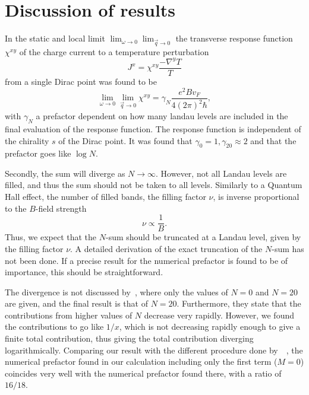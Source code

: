 \documentclass[
paper=B5,
]{scrbook}
\begin{document}
\section{Discussion of results}
In the static and local limit $\lim_{\omega \to 0} \lim_{\vec{q}\to 0}$ the  transverse response function $\chi^{xy}$ of the charge current to a temperature perturbation
\begin{equation}
  J^x = \chi ^{xy} \frac{- \nabla^y T}{T}
\end{equation}
from a single Dirac point was found  to be
\begin{equation}
  \lim_{\omega \to 0} \lim_{\vec{q}\to 0}
  \chi ^{xy}
  =
  \gamma_{N}
  \frac{e^2 B v_F}{4 (2\pi )^2 \hbar },
\end{equation}
with $\gamma _N$ a prefactor dependent on how many landau levels are included in the final evaluation of the response function.
The response function is independent of the chirality $s$ of the Dirac point.
It was found that $\gamma _0 = 1, \gamma _{20} \approx 2$ and that the prefactor goes like $\log N$.


Secondly, the sum will diverge as $N\to \infty $.
However, not all Landau levels are filled, and thus the sum should not be taken to all levels.
Similarly to a Quantum Hall effect, the number of filled bands, the filling factor $\nu $, is inverse proportional to the $B$-field strength
\begin{equation}
  \nu \propto \frac{1}{B}.
\end{equation}
Thus, we expect that the $N$-sum should be truncated at a Landau level, given by the filling factor $\nu $.
A detailed derivation of the exact truncation of the $N$-sum has not been done.
If a precise result for the numerical prefactor is found to be of importance, this should be straightforward.

The divergence is not discussed by~\citeauthor{arjonaFingerprintsConformalAnomaly2019}, where only the values of $N = 0$ and  $N=20$ are given, and the final result is that of $N=20$.
Furthermore, they state that the contributions from higher values of $N$ decrease very rapidly.
However, we found the contributions to go like $1 /x$, which is not decreasing rapidly enough to give a finite total contribution, thus giving the total contribution diverging logarithmically.
Comparing our result with the different procedure done by~\citeauthor{chernodubGenerationNernstCurrent2018}~\cite{chernodubGenerationNernstCurrent2018}, the numerical prefactor found in our calculation including only the first term ($M=0$) coincides very well with the numerical prefactor found there, with a ratio of $16 / 18$.

\appendix





\backmatter
\printglossaries

\printbibliography

% 
\end{document}
